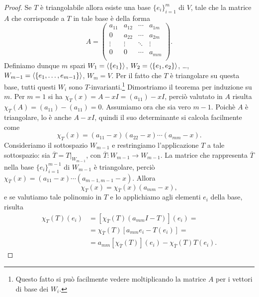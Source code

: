 \begin{proof}
	Se $T$ è triangolabile allora esiste una base $\{e_i\}_{i=1}^m$ di $V$, tale che la matrice $A$ che corrisponde a $T$ in tale base è della forma
	\begin{equation*}
		A=
		\begin{pmatrix}
			a_{11}	&a_{12}	&\cdots	&a_{1m}\\
			0		&a_{22}	&\cdots	&a_{2m}\\
			\vdots	&\vdots	&\ddots	&\vdots\\
			0		&0		&\cdots	&a_{mm}\\
		\end{pmatrix}.
	\end{equation*}
	Definiamo dunque $m$ spazi $W_1=\left\langle{\{e_1\}}\right\rangle$, $W_2=\left\langle{\{e_1,e_2\}}\right\rangle$, \dots, $W_{m-1}=\left\langle{\{e_1,\dots, e_{m-1}\}}\right\rangle$, $W_m=V$.
	Per il fatto che $T$ è triangolare su questa base, tutti questi $W_i$ sono $T$-invarianti.\footnote{Questo fatto si può facilmente vedere moltiplicando la matrice $A$ per i vettori di base dei $W_i$.}
	Dimostriamo il teorema per induzione su $m$.
	Per $m=1$ si ha $\chi_T(x)=A-xI=(a_{11})-xI$, perciò valutato in $A$ risulta $\chi_T(A)=(a_{11})-(a_{11})=0$.
	Assumiamo ora che sia vero $m-1$.
	Poichè $A$ è triangolare, lo è anche $A-xI$, quindi il suo determinante si calcola facilmente come
	\begin{equation*}
		\chi_T(x) = (a_{11}-x)(a_{22}-x)\cdots(a_{mm}-x).
	\end{equation*}
	Consideriamo il sottospazio $W_{m-1}$ e restringiamo l'applicazione $T$ a tale sottospazio: sia $\overline{T}=T|_{W_{m-1}}$, con $\overline{T}\colon W_{m-1}\to W_{m-1}$.
	La matrice che rappresenta $\overline{T}$ nella base $\{e_i\}_{i=1}^{m-1}$ di $W_{m-1}$ è triangolare, perciò $\chi_{\overline{T}}(x)=(a_{11}-x)\cdots(a_{m-1,m-1}-x)$.
	Allora
	\begin{equation*}
		\chi_T(x) = \chi_{\overline{T}}(x)(a_{mm}-x),
	\end{equation*}
	e se valutiamo tale polinomio in $T$ e lo applichiamo agli elementi $e_i$ della base, risulta
	\begin{equation*}
		\begin{split}
			\chi_T(T)(e_i)&=[\chi_{\overline{T}}(T)(a_{mm}I-T)](e_i)=\\
			&=\chi_{\overline{T}}(T)[a_{mm}e_i-T(e_i)]=\\
			&=a_{mm}[\chi_{\overline{T}}(T)](e_i)-\chi_{\overline{T}}(T)T(e_i).
		\end{split}
	\end{equation*}

\end{proof}
